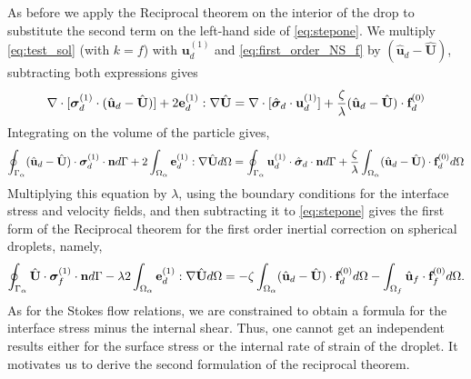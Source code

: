 As before we apply the Reciprocal theorem on the interior of the drop to substitute the second term on the left-hand side of \ref{eq:stepone}. 
We multiply \ref{eq:test_sol} (with $k = f$) with $\textbf{u}_d^{(1)}$ and \ref{eq:first_order_NS_f} by $(\hat{\textbf{u}}_d - \hat{\textbf{U}})$, subtracting both expressions gives
\begin{equation*}
     \mathbf{\nabla}\cdot [\bm\sigma_d^{(1)} \cdot (\hat{\textbf{u}}_d - \hat{\textbf{U}})]
     +2 \textbf{e}_d^{(1)} : \mathbf{\nabla} \hat{\textbf{U}}
     =
     \mathbf{\nabla}\cdot [\hat{\bm\sigma}_d \cdot \textbf{u}_d^{(1)}]
     + \frac{\zeta}{\lambda}(\hat{\textbf{u}}_d - \hat{\textbf{U}}) \cdot \textbf{f}_d^{(0)}
\end{equation*}
Integrating on the volume of the particle gives, 
\begin{equation}
    \intS{ (\hat{\textbf{u}}_d - \hat{\textbf{U}})\cdot \bm\sigma_d^{(1)} \cdot \textbf{n}}
    + 2 \intO{ \textbf{e}_d^{(1)} : \grad \hat{\textbf{U}} }
    =
    \intS{\textbf{u}_d^{(1)}\cdot\hat{\bm\sigma}_d \cdot \textbf{n}} 
    + \frac{\zeta}{\lambda} \intO{(\hat{\textbf{u}}_d - \hat{\textbf{U}}) \cdot \textbf{f}_d^{(0)}}
    \label{eq:reci_interior}
\end{equation}
Multiplying this equation by $\lambda$, using the boundary conditions  for the interface stress and velocity fields, and then subtracting it to \ref{eq:stepone} gives the first form of the Reciprocal theorem for the first order inertial correction on spherical droplets, namely,
\begin{equation}
    \intS{\hat{\textbf{U}}\cdot  \bm\sigma_f^{(1)} \cdot \textbf{n}}
    -\lambda 2 \intO{ \textbf{e}_d^{(1)} : \grad \hat{\textbf{U}} }
    = 
    - \zeta \intO{(\hat{\textbf{u}}_d - \hat{\textbf{U}}) \cdot \textbf{f}_d^{(0)}}
    - \intOf{\hat{\textbf{u}}_f\cdot  \textbf{f}^{(0)}_f}.
    \label{eq:reciprocal_f_one}
\end{equation}
As for the Stokes flow relations, we are constrained to obtain a formula for the interface stress minus the internal shear.
Thus, one cannot get an independent results either for the surface stress or the internal rate of strain of the droplet.  
It motivates us to derive the second formulation of the reciprocal theorem.

